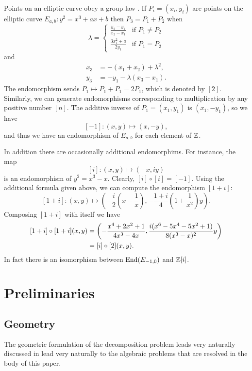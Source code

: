 Points on an elliptic curve obey a group law
\cite{SilvermanJH86}.  If $P_i = (x_i, y_i)$ are points on
the elliptic curve $E_{a,b} : y^2 = x^3+ax+b$ then $P_3 = P_1 + P_2$
when
\[
\lambda = \left\{\begin{array}{ll}
  \displaystyle\frac{y_2 - y_1}{x_2 - x_1} & \mbox{if $P_1 \not= P_2$}\\
  \displaystyle\frac{3x_1^2+a}{2y_1} & \mbox{if $P_1 = P_2$}
 \end{array}\right.
\]
and
\[
\begin{aligned}
  x_3 & = - (x_1 + x_2) + \lambda^2, \\ 
  y_3 & = -y_1 - \lambda (x_3 - x_1).
\end{aligned}
\]
The endomorphism  sends
$P_1\mapsto P_1 + P_1 = 2P_1$, which is denoted by $[2]$.  Similarly,
we can generate endomorphisms corresponding to multiplication by any
positive number $[n]$.  The additive inverse of $P_1 = (x_1, y_1)$ is
$(x_1, - y_1)$, so we have 
\[
[-1] : (x, y) \mapsto (x, - y),
\]
and thus we have an endomorphism of $E_{a,b}$ for each element of
$\mathbb{Z}$.

In addition there are occasionally additional endomorphims.  For
instance, the map 
\[
[i] : (x, y) \mapsto (-x, iy)
\]
is an endomorphism of $y^2 = x^3 -x$.  Clearly, $[i] \circ [i] =
[-1]$.  Using the additional formula given above, we can compute the
endomorphism $[1+i]$:
\[
[1+i] : (x, y) \mapsto \left(-\frac{i}{2}\left(x - \frac{1}{x}\right),
  -\frac{1+i}{4}\left(1 + \frac{1}{x^2}\right) y\right).
\]
Composing $[1+i]$ with itself we have
\[
\begin{aligned}
\relax [1+i]\circ[1+i](x,y) & = \left(
-\frac{x^4+2x^2+1}{4x^3-4x}, \frac{i(x^6-5x^4-5x^2+1)}{8(x^3-x)^2}y\right)\\
& = [i] \circ [2] (x,y).
\end{aligned}
\]
In fact there is an isomorphism between $\mathop{\rm End}\nolimits(E_{-1,0})$ and $\mathbb{Z}[i]$.

\section{Preliminaries}
\label{Generalities:Sec}

\subsection{Geometry}
The geometric formulation of the decomposition problem leads very
naturally discussed in  lead very
naturally to the algebraic problems that are resolved in the body of
this paper. 

